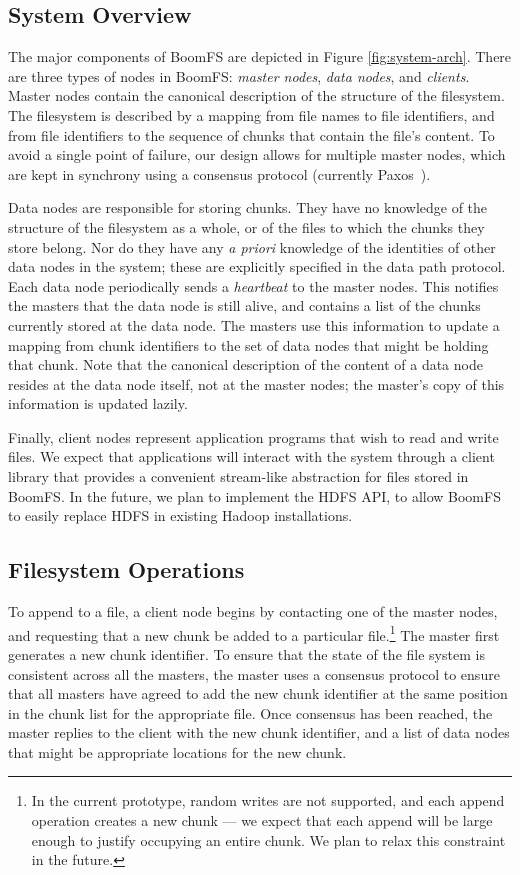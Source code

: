 \documentclass[twocolumn]{article}
\begin{document}
\subsection{System Overview}
The major components of BoomFS are depicted in Figure
\ref{fig:system-arch}. There are three types of nodes in BoomFS:
\emph{master nodes}, \emph{data nodes}, and \emph{clients}. Master
nodes contain the canonical description of the structure of the
filesystem. The filesystem is described by a mapping from file names
to file identifiers, and from file identifiers to the sequence of
chunks that contain the file's content. To avoid a single point of
failure, our design allows for multiple master nodes, which are kept
in synchrony using a consensus protocol (currently
Paxos~\cite{paxos-made-simple}).

Data nodes are responsible for storing chunks. They have no knowledge
of the structure of the filesystem as a whole, or of the files to which  
the chunks they store belong.  Nor do they have any \emph{a priori} knowledge
of the identities of other data nodes in the system;  these are explicitly
specified in the data path protocol.  Each data node periodically sends a
\emph{heartbeat} to the master nodes. This notifies the masters that
the data node is still alive, and contains a list of the chunks
currently stored at the data node. The masters use this information to
update a mapping from chunk identifiers to the set of data nodes that
might be holding that chunk. Note that the canonical description of
the content of a data node resides at the data node itself, not at the
master nodes; the master's copy of this information is updated lazily.

Finally, client nodes represent application programs that wish to read
and write files. We expect that applications will interact with the
system through a client library that provides a convenient stream-like
abstraction for files stored in BoomFS. In the future, we plan to
implement the HDFS API, to allow BoomFS to easily replace HDFS in
existing Hadoop installations. %

\subsection{Filesystem Operations}
\label{fs-ops}
To append to a file, a client node begins by contacting one of the
master nodes, and requesting that a new chunk be added to a particular
file.\footnote{In the current prototype, random writes are not
  supported, and each append operation creates a new chunk --- we
  expect that each append will be large enough to justify occupying an
  entire chunk. We plan to relax this constraint in the future.} The
master first generates a new chunk identifier. To ensure that the
state of the file system is consistent across all the masters, the
master uses a consensus protocol to ensure that all masters have
agreed to add the new chunk identifier at the same position in the
chunk list for the appropriate file. Once consensus has been reached,
the master replies to the client with the new chunk identifier, and a
list of data nodes that might be appropriate locations for the new
chunk.
\end{document}
